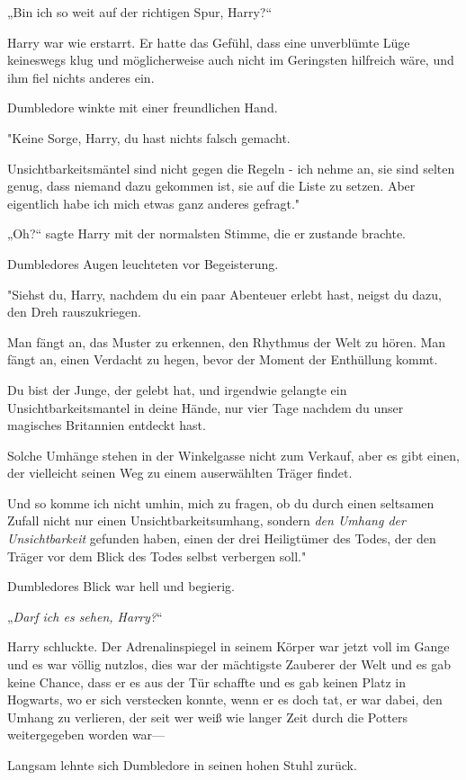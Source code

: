 {„Bin ich so weit auf der richtigen Spur, Harry?“

Harry war wie erstarrt. Er hatte das Gefühl, dass eine unverblümte Lüge keineswegs klug und möglicherweise auch nicht im Geringsten hilfreich wäre, und ihm fiel nichts anderes ein.

Dumbledore winkte mit einer freundlichen Hand.

"Keine Sorge, Harry, du hast nichts falsch gemacht.

Unsichtbarkeitsmäntel sind nicht gegen die Regeln - ich nehme an, sie sind selten genug, dass niemand dazu gekommen ist, sie auf die Liste zu setzen. Aber eigentlich habe ich mich etwas ganz anderes gefragt."

„Oh?“ sagte Harry mit der normalsten Stimme, die er zustande brachte.

Dumbledores Augen leuchteten vor Begeisterung.

"Siehst du, Harry, nachdem du ein paar Abenteuer erlebt hast, neigst du dazu, den Dreh rauszukriegen.

Man fängt an, das Muster zu erkennen, den Rhythmus der Welt zu hören. Man fängt an, einen Verdacht zu hegen, bevor der Moment der Enthüllung kommt.

Du bist der Junge, der gelebt hat, und irgendwie gelangte ein Unsichtbarkeitsmantel in deine Hände, nur vier Tage nachdem du unser magisches Britannien entdeckt hast.

Solche Umhänge stehen in der Winkelgasse nicht zum Verkauf, aber es gibt einen, der vielleicht seinen Weg zu einem auserwählten Träger findet.

Und so komme ich nicht umhin, mich zu fragen, ob du durch einen seltsamen Zufall nicht nur einen Unsichtbarkeitsumhang, sondern \emph{den Umhang der Unsichtbarkeit} gefunden haben, einen der drei Heiligtümer des Todes, der den Träger vor dem Blick des Todes selbst verbergen soll."

Dumbledores Blick war hell und begierig.

„\emph{Darf ich es sehen, Harry?}“

Harry schluckte. Der Adrenalinspiegel in seinem Körper war jetzt voll im Gange und es war völlig nutzlos, dies war der mächtigste Zauberer der Welt und es gab keine Chance, dass er es aus der Tür schaffte und es gab keinen Platz in Hogwarts, wo er sich verstecken konnte, wenn er es doch tat, er war dabei, den Umhang zu verlieren, der seit wer weiß wie langer Zeit durch die Potters weitergegeben worden war—

Langsam lehnte sich Dumbledore in seinen hohen Stuhl zurück.

}
